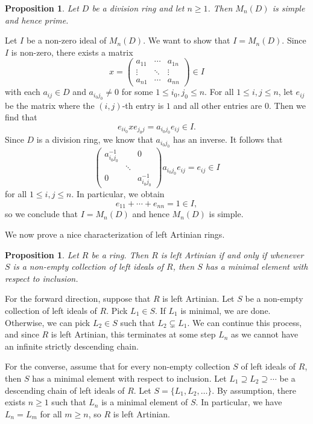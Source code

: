 \documentclass[10pt]{article}
\makeatletter
\numberwithin{equation}{section}
\theoremstyle{newstyle}
\newtheorem{prop}[thm]{Proposition}
\newenvironment{pf}[1][\proofname]{\par
  \pushQED{\qed}%
  \normalfont \topsep0\p@\relax
  \trivlist
  \item[\hskip\labelsep\scshape
  #1\@addpunct{.}]\ignorespaces
}{%
  \popQED\endtrivlist\@endpefalse
}
\makeatother
\begin{document}
\begin{prop}
Let $D$ be a division ring and let $n \geq 1$. Then $M_n(D)$ is simple and hence prime. 
\end{prop}
\begin{pf}
Let $I$ be a non-zero ideal of $M_n(D)$. We want to show that $I = M_n(D)$. Since $I$ is 
non-zero, there exists a matrix 
\[ x = \begin{pmatrix} a_{11} & \cdots & a_{1n} \\ \vdots & \ddots & \vdots \\ a_{n1} & \cdots & a_{nn} \end{pmatrix} \in I \]
with each $a_{ij} \in D$ and $a_{i_0j_0} \neq 0$ for some $1 \leq i_0, j_0 \leq n$. For all 
$1 \leq i, j \leq n$, let $e_{ij}$ be the matrix where the $(i,j)$-th entry is $1$ and all other entries
are $0$. Then we find that 
\[ e_{ii_0}xe_{j_0j} = a_{i_0j_0}e_{ij} \in I. \]
Since $D$ is a division ring, we know that $a_{i_0j_0}$ has an inverse. It follows that 
\[ \begin{pmatrix} a_{i_0j_0}^{-1} & & 0 \\ & \ddots \\ 0 & & a_{i_0j_0}^{-1} \end{pmatrix} a_{i_0j_0} e_{ij} = e_{ij} \in I \]
for all $1 \leq i, j \leq n$. In particular, we obtain 
\[ e_{11} + \cdots + e_{nn} = 1 \in I, \]
so we conclude that $I = M_n(D)$ and hence $M_n(D)$ is simple. 
\end{pf}

We now prove a nice characterization of left Artinian rings. 

\begin{prop}
Let $R$ be a ring. Then $R$ is left Artinian if and only if whenever $S$ is a non-empty collection 
of left ideals of $R$, then $S$ has a minimal element with respect to inclusion. 
\end{prop}
\begin{pf}
For the forward direction, suppose that $R$ is left Artinian. Let $S$ be a non-empty collection of 
left ideals of $R$. Pick $L_1 \in S$. If $L_1$ is minimal, we are done. Otherwise, we can pick $L_2 
\in S$ such that $L_2 \subsetneq L_1$. We can continue this process, and since $R$ is left 
Artinian, this terminates at some step $L_n$ as we cannot have an infinite strictly descending chain.

For the converse, assume that for every non-empty collection $S$ of left ideals of $R$, then 
$S$ has a minimal element with respect to inclusion. Let $L_1 \supseteq L_2 \supseteq \cdots$ 
be a descending chain of left ideals of $R$. Let $S = \{L_1, L_2, \dots\}$. By assumption, there 
exists $n \geq 1$ such that $L_n$ is a minimal element of $S$. In particular, we have 
$L_n = L_m$ for all $m \geq n$, so $R$ is left Artinian.
\end{pf}
\end{document}

